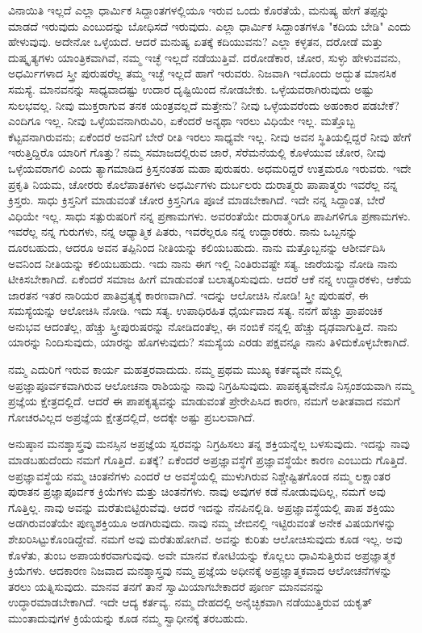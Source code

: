 ವಿನಾಯಿತಿ ಇಲ್ಲದೆ ಎಲ್ಲಾ ಧಾರ್ಮಿಕ ಸಿದ್ದಾಂತಗಳಲ್ಲಿಯೂ ಇರುವ ಒಂದು ಕೊರತೆಯೆ, ಮನುಷ್ಯ ಹೇಗೆ ತಪ್ಪನ್ನು ಮಾಡದೆ ಇರುವುದು ಎಂಬುದನ್ನು ಬೋಧಿಸದೆ ಇರುವುದು. ಎಲ್ಲಾ ಧಾರ್ಮಿಕ ಸಿದ್ದಾಂತಗಳೂ "ಕದಿಯ ಬೇಡಿ" ಎಂದು ಹೇಳುವುವು. ಅದೇನೋ ಒಳ್ಳೆಯದೆ. ಆದರೆ ಮನುಷ್ಯ ಏತಕ್ಕೆ ಕದಿಯುವನು? ಎಲ್ಲಾ ಕಳ್ಳತನ, ದರೋಡೆ ಮತ್ತು ದುಷ್ಕೃತ್ಯಗಳು ಯಾಂತ್ರಿಕವಾಗಿವೆ, ನಮ್ಮ ಇಚ್ಛೆ ಇಲ್ಲದೆ ನಡೆಯುತ್ತಿವೆ. ದರೋಡೆಕಾರ, ಚೋರ, ಸುಳ್ಳು ಹೇಳುವವನು, ಅಧರ್ಮಿಗಳಾದ ಸ್ತ್ರೀ ಪುರುಷರೆಲ್ಲ ತಮ್ಮ ಇಚ್ಛೆ ಇಲ್ಲದೆ ಹಾಗೆ ಇರುವರು. ನಿಜವಾಗಿ ಇದೊಂದು ಅದ್ಭುತ ಮಾನಸಿಕ ಸಮಸ್ಯೆ. ಮಾನವನನ್ನು ಸಾಧ್ಯವಾದಷ್ಟು ಉದಾರ ದೃಷ್ಟಿಯಿಂದ ನೋಡಬೇಕು. ಒಳ್ಳೆಯವರಾಗಿರುವುದು ಅಷ್ಟು ಸುಲಭವಲ್ಲ. ನೀವು ಮುಕ್ತರಾಗುವ ತನಕ ಯಂತ್ರವಲ್ಲದೆ ಮತ್ತೇನು? ನೀವು ಒಳ್ಳೆಯವರೆಂದು ಅಹಂಕಾರ ಪಡಬೇಕೆ? ಎಂದಿಗೂ ಇಲ್ಲ. ನೀವು ಒಳ್ಳೆಯವನಾಗಿರುವಿರಿ, ಏಕೆಂದರೆ ಅನ್ಯಥಾ ಇರಲು ವಿಧಿಯೇ ಇಲ್ಲ. ಮತ್ತೊಬ್ಬ ಕೆಟ್ಟವನಾಗಿರುವನು; ಏಕೆಂದರೆ ಅವನಿಗೆ ಬೇರೆ ರೀತಿ ಇರಲು ಸಾಧ್ಯವೇ ಇಲ್ಲ. ನೀವು ಅವನ ಸ್ಥಿತಿಯಲ್ಲಿದ್ದರೆ ನೀವು ಹೇಗೆ ಇರುತ್ತಿದ್ದಿರೊ ಯಾರಿಗೆ ಗೊತ್ತು? ನಮ್ಮ ಸಮಾಜದಲ್ಲಿರುವ ಜಾರೆ, ಸೆರೆಮನೆಯಲ್ಲಿ ಕೊಳೆಯುವ ಚೋರ, ನೀವು ಒಳ್ಳೆಯವರಾಗಲಿ ಎಂದು ತ್ಯಾಗಮಾಡಿದ ಕ್ರಿಸ್ತನಂತಹ ಮಹಾ ಪುರುಷರು. ಅಧಮರಿದ್ದರೆ ಉತ್ತಮರೂ ಇರುವರು. ಇದೇ ಪ್ರಕೃತಿ ನಿಯಮ, ಚೋರರು ಕೊಲೆಪಾತಕಿಗಳು ಅಧರ್ಮಿಗಳು ದುರ್ಬಲರು ದುರಾತ್ಮರು ಪಾಪಾತ್ಮರು ಇವರೆಲ್ಲ ನನ್ನ ಕ್ರಿಸ್ತರು. ಸಾಧು ಕ್ರಿಸ್ತನಿಗೆ ಮಾಡುವಂತೆ ಚೋರ ಕ್ರಿಸ್ತನಿಗೂ ಪೂಜೆ ಮಾಡಬೇಕಾಗಿದೆ. ಇದೇ ನನ್ನ ಸಿದ್ದಾಂತ, ಬೇರೆ ವಿಧಿಯೇ ಇಲ್ಲ. ಸಾಧು ಸತ್ಪುರುಷರಿಗೆ ನನ್ನ ಪ್ರಣಾಮಗಳು. ಅವರಂತೆಯೇ ದುರಾತ್ಮರಿಗೂ ಪಾಪಿಗಳಿಗೂ ಪ್ರಣಾಮಗಳು. ಇವರೆಲ್ಲ ನನ್ನ ಗುರುಗಳು, ನನ್ನ ಆಧ್ಯಾತ್ಮಿಕ ಪಿತರು, ಇವರೆಲ್ಲರೂ ನನ್ನ ಉದ್ದಾರಕರು. ನಾನು ಒಬ್ಬನನ್ನು ದೂರಬಹುದು, ಆದರೂ ಅವನ ತಪ್ಪಿನಿಂದ ನೀತಿಯನ್ನು ಕಲಿಯಬಹುದು. ನಾನು ಮತ್ತೊಬ್ಬನನ್ನು ಆಶೀರ್ವದಿಸಿ ಅವನಿಂದ ನೀತಿಯನ್ನು ಕಲಿಯಬಹುದು. ಇದು ನಾನು ಈಗ ಇಲ್ಲಿ ನಿಂತಿರುವಷ್ಟೇ ಸತ್ಯ. ಜಾರೆಯನ್ನು ನೋಡಿ ನಾನು ಟೀಕಿಸಬೇಕಾಗಿದೆ. ಏಕೆಂದರೆ ಸಮಾಜ ಹೀಗೆ ಮಾಡುವಂತೆ ಬಲಾತ್ಕರಿಸುವುದು. ಆದರೆ ಆಕೆ ನನ್ನ ಉದ್ದಾರಕಳು, ಆಕೆಯ ಜಾರತನ ಇತರ ನಾರಿಯರ ಪಾತಿವ್ರತ್ಯಕ್ಕೆ ಕಾರಣವಾಗಿದೆ. ಇದನ್ನು ಆಲೋಚಿಸಿ ನೋಡಿ! ಸ್ತ್ರೀ ಪುರುಷರೆ, ಈ ಸಮಸ್ಯೆಯನ್ನು ಆಲೋಚಿಸಿ ನೋಡಿ. ಇದು ಸತ್ಯ. ಉಪಾಧಿರಹಿತ ಧೈರ್ಯವಾದ ಸತ್ಯ. ನನಗೆ ಹೆಚ್ಚು ಪ್ರಾಪಂಚಿಕ ಅನುಭವ ಆದಂತೆಲ್ಲ, ಹೆಚ್ಚು ಸ್ತ್ರೀಪುರುಷರನ್ನು ನೋಡಿದಂತೆಲ್ಲ, ಈ ನಂಬಿಕೆ ನನ್ನಲ್ಲಿ ಹೆಚ್ಚು ದೃಢವಾಗುತ್ತಿದೆ. ನಾನು ಯಾರನ್ನು ನಿಂದಿಸುವುದು, ಯಾರನ್ನು ಹೊಗಳುವುದು? ಸಮಸ್ಯೆಯ ಎರಡು ಪಕ್ಷವನ್ನೂ ನಾನು ತಿಳಿದುಕೊಳ್ಳಬೇಕಾಗಿದೆ.

ನಮ್ಮ ಎದುರಿಗೆ ಇರುವ ಕಾರ್ಯ ಮಹತ್ತರವಾದುದು. ನಮ್ಮ ಪ್ರಥಮ ಮುಖ್ಯ ಕರ್ತವ್ಯವೇ ನಮ್ಮಲ್ಲಿ ಅಪ್ರಜ್ಞಾಪೂರ್ವಕವಾಗಿರುವ ಆಲೋಚನಾ ರಾಶಿಯನ್ನು ನಾವು ನಿಗ್ರಹಿಸುವುದು. ಪಾಪಕೃತ್ಯವೇನೊ ನಿಸ್ಸಂಶಯವಾಗಿ ನಮ್ಮ ಪ್ರಜ್ಞೆಯ ಕ್ಷೇತ್ರದಲ್ಲಿದೆ. ಆದರೆ ಈ ಪಾಪಕೃತ್ಯವನ್ನು ಮಾಡುವಂತೆ ಪ್ರೇರೇಪಿಸಿದ ಕಾರಣ, ನಮಗೆ ಅತೀತವಾದ ನಮಗೆ ಗೋಚರವಿಲ್ಲದ ಅಪ್ರಜ್ಞೆಯ ಕ್ಷೇತ್ರದಲ್ಲಿದೆ, ಅದಕ್ಕೇ ಅಷ್ಟು ಪ್ರಬಲವಾಗಿದೆ.

ಅನುಷ್ಠಾನ ಮನಶ್ಶಾಸ್ತ್ರವು ಮನಸ್ಸಿನ ಅಪ್ರಜ್ಞೆಯ ಸ್ವರವನ್ನು ನಿಗ್ರಹಿಸಲು ತನ್ನ ಶಕ್ತಿಯನ್ನೆಲ್ಲ ಬಳಸುವುದು. ಇದನ್ನು ನಾವು ಮಾಡಬಹುದೆಂದು ನಮಗೆ ಗೊತ್ತಿದೆ. ಏತಕ್ಕೆ? ಏಕೆಂದರೆ ಅಪ್ರಜ್ಞಾವಸ್ಥೆಗೆ ಪ್ರಜ್ಞಾವಸ್ಥೆಯೇ ಕಾರಣ ಎಂಬುದು ಗೊತ್ತಿದೆ. ಅಪ್ರಜ್ಞಾವಸ್ಥೆಯ ನಮ್ಮ ಚಿಂತನೆಗಳು ಎಂದರೆ ಆ ಅವಸ್ಥೆಯಲ್ಲಿ ಮುಳುಗಿರುವ ನಿಶ್ಚೇಷ್ಟಿತಗೊಂಡ ನಮ್ಮ ಲಕ್ಷಾಂತರ ಪುರಾತನ ಪ್ರಜ್ಞಾಪೂರ್ವಕ ಕ್ರಿಯೆಗಳು ಮತ್ತು ಚಿಂತನೆಗಳು. ನಾವು ಅವುಗಳ ಕಡೆ ನೋಡುವುದಿಲ್ಲ, ನಮಗೆ ಅವು ಗೊತ್ತಿಲ್ಲ. ನಾವು ಅವನ್ನು ಮರೆತುಬಿಟ್ಟಿರುವೆವು. ಆದರೆ ಇದನ್ನು ನೆನಪಿನಲ್ಲಿಡಿ. ಅಪ್ರಜ್ಞಾವಸ್ಥೆಯಲ್ಲಿ ಪಾಪ ಶಕ್ತಿಯು ಅಡಗಿರುವಂತೆಯೇ ಪುಣ್ಯಶಕ್ತಿಯೂ ಅಡಗಿರುವುದು. ನಾವು ನಮ್ಮ ಜೇಬಿನಲ್ಲಿ ಇಟ್ಟಿರುವಂತೆ ಅನೇಕ ವಿಷಯಗಳನ್ನು ಶೇಖರಿಸಿಟ್ಟುಕೊಂಡಿದ್ದೇವೆ. ನಮಗೆ ಅವು ಮರೆತುಹೋಗಿವೆ. ಅವನ್ನು ಕುರಿತು ಆಲೋಚಿಸುವುದು ಕೂಡ ಇಲ್ಲ. ಅವು ಕೊಳೆತು, ತುಂಬ ಅಪಾಯಕರವಾಗುವುವು. ಅವೇ ಮಾನವ ಕೋಟಿಯನ್ನು ಕೊಲ್ಲಲು ಧಾವಿಸುತ್ತಿರುವ ಅಪ್ರಜ್ಞಾತ್ಮಕ ಕ್ರಿಯೆಗಳು. ಆದಕಾರಣ ನಿಜವಾದ ಮನಶ್ಶಾಸ್ತ್ರವು ನಮ್ಮ ಪ್ರಜ್ಞೆಯ ಅಧೀನಕ್ಕೆ ಅಪ್ರಜ್ಞಾತ್ಮಕವಾದ ಆಲೋಚನೆಗಳನ್ನು ತರಲು ಯತ್ನಿಸುವುದು. ಮಾನವ ತನಗೆ ತಾನೆ ಸ್ವಾಮಿಯಾಗಬೇಕಾದರೆ ಪೂರ್ಣ ಮಾನವನನ್ನು ಉದ್ಧಾರಮಾಡಬೇಕಾಗಿದೆ. ಇದೇ ಆದ್ಯ ಕರ್ತವ್ಯ. ನಮ್ಮ ದೇಹದಲ್ಲಿ ಅನೈಚ್ಛಿಕವಾಗಿ ನಡೆಯುತ್ತಿರುವ ಯಕೃತ್ ಮುಂತಾದುವುಗಳ ಕ್ರಿಯೆಯನ್ನು ಕೂಡ ನಮ್ಮ ಸ್ವಾಧೀನಕ್ಕೆ ತರಬಹುದು.

